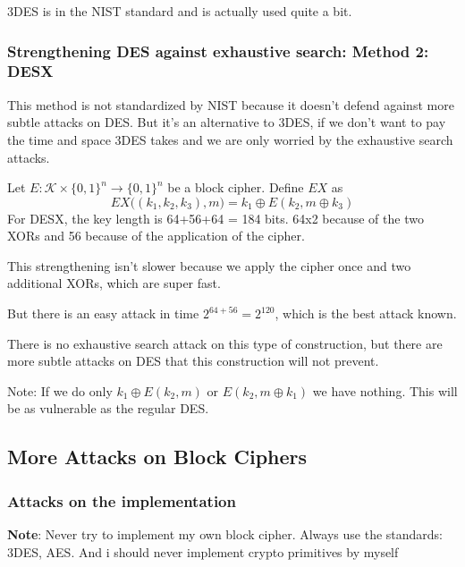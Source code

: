 \documentclass[12pt]{book}
\begin{document}
3DES is in the NIST standard and is actually used quite a bit.

\subsubsection{Strengthening DES against exhaustive search: Method 2: DESX}
This method is not standardized by NIST because it doesn't defend against more subtle attacks on DES. But it's an alternative to 3DES, if we don't want to pay the time and space 3DES takes and we are only worried by the exhaustive search attacks.

Let $E:\mathcal{K}\times\{0,1\}^{n}\rightarrow\{0,1\}^{n}$ be a block cipher. Define $EX$ as
$$EX\big((k_{1},k_{2},k_{3}),m\big)=k_{1}\oplus E(k_{2},m\oplus k_{3})$$
For DESX, the key length is 64+56+64 = 184 bits. 64x2 because of the two XORs and 56 because of the application of the cipher.

This strengthening isn't slower because we apply the cipher once and two additional XORs, which are super fast.

But there is an easy attack in time $2^{64+56}=2^{120}$, which is the best attack known.

There is no exhaustive search attack on this type of construction, but there are more subtle attacks on DES that this construction will not prevent.

Note: If we do only $k_{1}\oplus E(k_{2},m)$ or $E(k_{2},m\oplus k_{1})$ we have nothing. This will be as vulnerable as the regular DES.

\subsection{More Attacks on Block Ciphers}
\subsubsection{Attacks on the implementation}
\textbf{Note}: Never try to implement my own block cipher. Always use the standards: 3DES, AES. And i should never implement crypto primitives by myself
\end{document}
